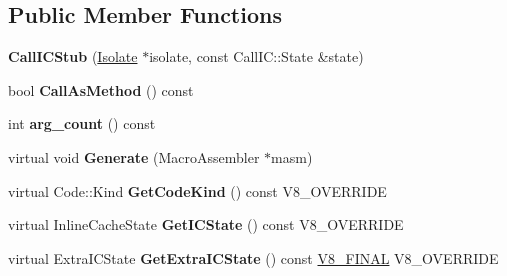 \subsection*{Public Member Functions}
\begin{DoxyCompactItemize}
\item 
\hypertarget{classv8_1_1internal_1_1_call_i_c_stub_a676ac2f91985af8f2d3f71c739f16aa2}{}{\bfseries Call\+I\+C\+Stub} (\hyperlink{classv8_1_1internal_1_1_isolate}{Isolate} $\ast$isolate, const Call\+I\+C\+::\+State \&state)\label{classv8_1_1internal_1_1_call_i_c_stub_a676ac2f91985af8f2d3f71c739f16aa2}

\item 
\hypertarget{classv8_1_1internal_1_1_call_i_c_stub_ab41eb50186cacef5b962178019c24e0f}{}bool {\bfseries Call\+As\+Method} () const \label{classv8_1_1internal_1_1_call_i_c_stub_ab41eb50186cacef5b962178019c24e0f}

\item 
\hypertarget{classv8_1_1internal_1_1_call_i_c_stub_a9a128edc28aa0996564f0ada3fb37010}{}int {\bfseries arg\+\_\+count} () const \label{classv8_1_1internal_1_1_call_i_c_stub_a9a128edc28aa0996564f0ada3fb37010}

\item 
\hypertarget{classv8_1_1internal_1_1_call_i_c_stub_a598300329bbe1b1c1692ffb5f81a92f4}{}virtual void {\bfseries Generate} (Macro\+Assembler $\ast$masm)\label{classv8_1_1internal_1_1_call_i_c_stub_a598300329bbe1b1c1692ffb5f81a92f4}

\item 
\hypertarget{classv8_1_1internal_1_1_call_i_c_stub_afe53795d39065bca95cfb5c16332d6aa}{}virtual Code\+::\+Kind {\bfseries Get\+Code\+Kind} () const V8\+\_\+\+O\+V\+E\+R\+R\+I\+D\+E\label{classv8_1_1internal_1_1_call_i_c_stub_afe53795d39065bca95cfb5c16332d6aa}

\item 
\hypertarget{classv8_1_1internal_1_1_call_i_c_stub_acb4cfb4156d9dba7b7a789ad8d17ea0f}{}virtual Inline\+Cache\+State {\bfseries Get\+I\+C\+State} () const V8\+\_\+\+O\+V\+E\+R\+R\+I\+D\+E\label{classv8_1_1internal_1_1_call_i_c_stub_acb4cfb4156d9dba7b7a789ad8d17ea0f}

\item 
\hypertarget{classv8_1_1internal_1_1_call_i_c_stub_a6af2c0b9fd3eb48d0dc0df01a3446864}{}virtual Extra\+I\+C\+State {\bfseries Get\+Extra\+I\+C\+State} () const \hyperlink{classv8_1_1internal_1_1_v8___f_i_n_a_l}{V8\+\_\+\+F\+I\+N\+A\+L} V8\+\_\+\+O\+V\+E\+R\+R\+I\+D\+E\label{classv8_1_1internal_1_1_call_i_c_stub_a6af2c0b9fd3eb48d0dc0df01a3446864}

\end{DoxyCompactItemize}
